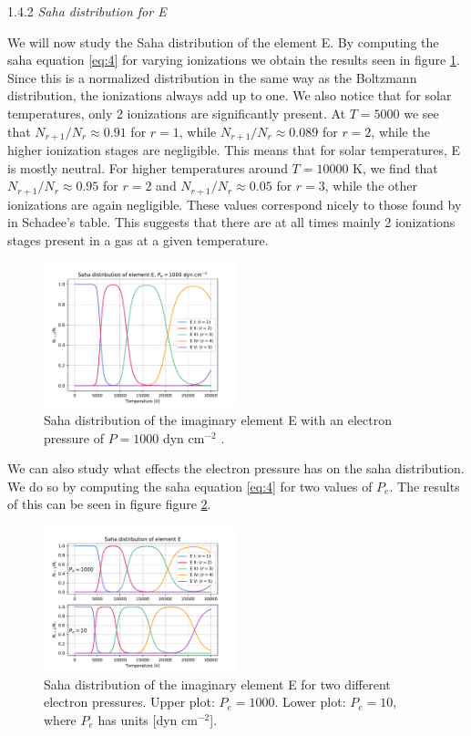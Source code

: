 \documentclass[a4paper,11.5pt,]{article}
\begin{document}
\begin{multicols}{2}
\begin{center}
1.4.2\textit{ Saha distribution for E}
\end{center}
We will now study the Saha distribution of the element E. By computing the saha equation \eqref{eq:4} for varying ionizations we obtain the results seen in figure \ref{fig:3}. Since this is a normalized distribution in the same way as the Boltzmann distribution, the ionizations always add up to one. We also notice that for solar temperatures, only 2 ionizations are significantly present. At $T = 5000$ we see that $N_{r+1}/N_r \approx 0.91$ for $r = 1$, while  $N_{r+1}/N_r \approx 0.089$ for $r = 2$, while the higher ionization stages are negligible. This means that for solar temperatures, E is mostly neutral. For higher temperatures around $T = 10000$ K, we find that $N_{r+1}/N_r \approx 0.95$ for $r = 2$ and $N_{r+1}/N_r \approx 0.05$ for $r = 3$, while the other ionizations are again negligible. These values correspond nicely to those found by in Schadee's table. This suggests that there are at all times mainly 2 ionizations stages present in a gas at a given temperature.


\begin{figure}[H]
	\centering
	\includegraphics[width=0.5\textwidth]{figures/saha_E.pdf}
	\caption{Saha distribution of the imaginary element E with an electron pressure of $P = 1000$ dyn cm$^{-2}$ .}
	\label{fig:3}
\end{figure}

We can also study what effects the electron pressure has on the saha distribution. We do so by computing the saha equation \eqref{eq:4} for two values of $P_e$. The results of this can be seen in figure figure \ref{fig:4}.


\begin{figure}[H]
	\centering
	\includegraphics[width=0.5\textwidth]{figures/saha_sub.pdf}
	\caption{Saha distribution of the imaginary element E for two different electron pressures. Upper plot: $P_e = 1000$. Lower plot: $P_e = 10$, where $P_e$ has units [dyn cm$^{-2}$].}
	\label{fig:4}
\end{figure}


\end{multicols}
\end{document}
